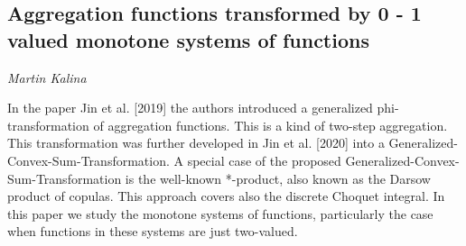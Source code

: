 \documentclass[../booklet.tex]{subfiles}
\begin{document}
\subsection[Aggregation functions transformed by 0 - 1 valued monotone systems of  functions. {\it Martin Kalina}]{Aggregation functions transformed by 0 - 1 valued monotone systems of  functions}

\begin{center}
  {\it Martin Kalina}
\end{center}

\vskip 0.8cm


In the paper  Jin et al. [2019] the authors introduced a generalized phi-transformation of aggregation functions. This is a kind of two-step aggregation. This transformation was further developed in  Jin et al. [2020] into a Generalized-Convex-Sum-Transformation. A special case of the proposed  Generalized-Convex-Sum-Transformation is the well-known *-product, also known as the Darsow product of copulas. This approach covers also the discrete Choquet integral. In this paper we  study the monotone systems of functions, particularly the case when functions in these systems are just two-valued.

	
\end{document}

